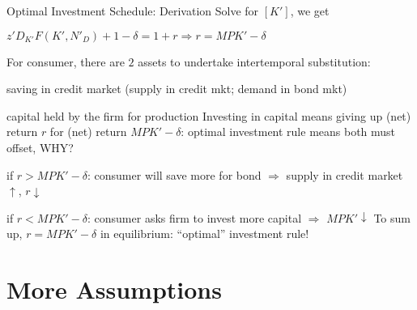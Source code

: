 \documentclass[11pt,aspectratio=169,usenames,dvipsnames]{beamer}
\let\tempone\itemize
\let\temptwo\enditemize
\renewenvironment{itemize}{\tempone\addtolength{\itemsep}{\fill}}{\temptwo}
\let\tempa\enumerate
\let\tempb\endenumerate
\renewenvironment{enumerate}{\tempa\addtolength{\itemsep}{\fill}}{\tempb}
\begin{document}
\begin{frame}{Optimal Investment Schedule: Derivation}
\label{slide:Optimal_Investment_Schedule__Derivation}
    Solve for $ [ K' ] $, we get
    \begin{center}
        $ \displaystyle z' D_{K'} F( K', N'_{D} ) + 1 - \delta = 1+r \Rightarrow r = MPK' - \delta $
    \end{center}
    For consumer, there are $ 2 $ assets to undertake \alert{intertemporal substitution}:
    \begin{enumerate}
        \item saving in credit market (supply in credit mkt; demand in bond mkt)
        \item capital held by the firm for production
    \end{enumerate}
    Investing in capital means giving up (net) return $ r $ for (net) return $ MPK' - \delta $: \alert{optimal investment rule means both must offset, WHY?}
    \begin{itemize}
        \item if $ r > MPK' - \delta $: consumer will save more for bond $ \Rightarrow $ supply in credit market  $ \uparrow  $, $ r \downarrow  $
        \item if $ r < MPK' - \delta $: consumer asks firm to invest more capital $ \Rightarrow  $ $ MPK' \downarrow  $
    \end{itemize}
    To sum up, $ r = MPK' - \delta $ in equilibrium: ``optimal'' investment rule!

\end{frame}

\section{More Assumptions}
\label{sec:More_Assumptions}
\end{document}
